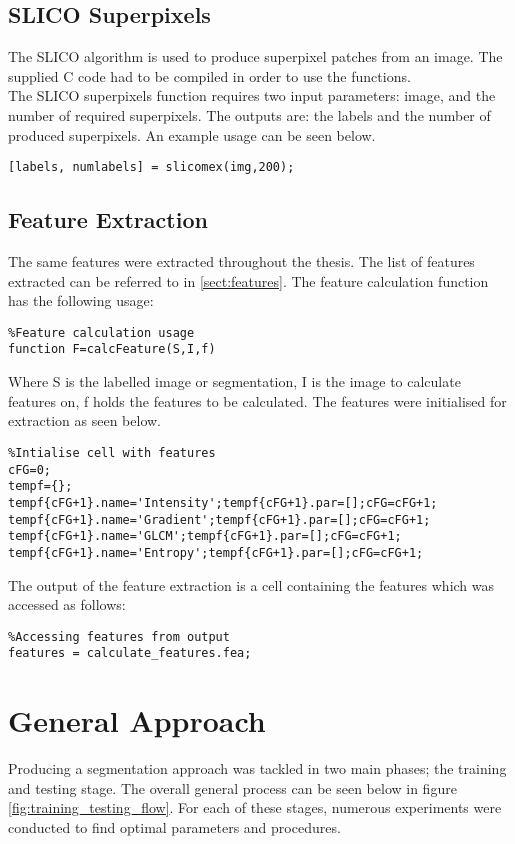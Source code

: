 \subsection{SLICO Superpixels}
\label{sect:slico}
The SLICO algorithm is used to produce superpixel patches from an image. The supplied C code had to be compiled in order to use the functions.
\\[1\baselineskip]
 The SLICO superpixels function requires two input parameters: image, and the number of required superpixels. The outputs are: the labels and the number of produced superpixels. An example usage can be seen below. 
\begin{lstlisting}
[labels, numlabels] = slicomex(img,200);
\end{lstlisting}
\subsection{Feature Extraction}
\label{sect:calcFeature}
The same features were extracted throughout the thesis. The list of features extracted can be referred to in \ref{sect:features}. The feature calculation function has the following usage:
\begin{lstlisting}
%Feature calculation usage
function F=calcFeature(S,I,f)
\end{lstlisting}
\medskip
Where S is the labelled image or segmentation, I is the image to calculate features on, f holds the features to be calculated. The features were initialised for extraction as seen below.
\begin{lstlisting}
%Intialise cell with features
cFG=0;
tempf={};
tempf{cFG+1}.name='Intensity';tempf{cFG+1}.par=[];cFG=cFG+1;
tempf{cFG+1}.name='Gradient';tempf{cFG+1}.par=[];cFG=cFG+1;
tempf{cFG+1}.name='GLCM';tempf{cFG+1}.par=[];cFG=cFG+1;
tempf{cFG+1}.name='Entropy';tempf{cFG+1}.par=[];cFG=cFG+1;
\end{lstlisting}
\medskip
The output of the feature extraction is a cell containing the features which was accessed as follows:
\begin{lstlisting}
%Accessing features from output
features = calculate_features.fea;
\end{lstlisting}

\pagebreak
\section{General Approach}
Producing a segmentation approach was tackled in two main phases; the training and testing stage. The overall general process can be seen below in figure \ref{fig:training_testing_flow}. For each of these stages, numerous experiments were conducted to find optimal parameters and procedures. 

